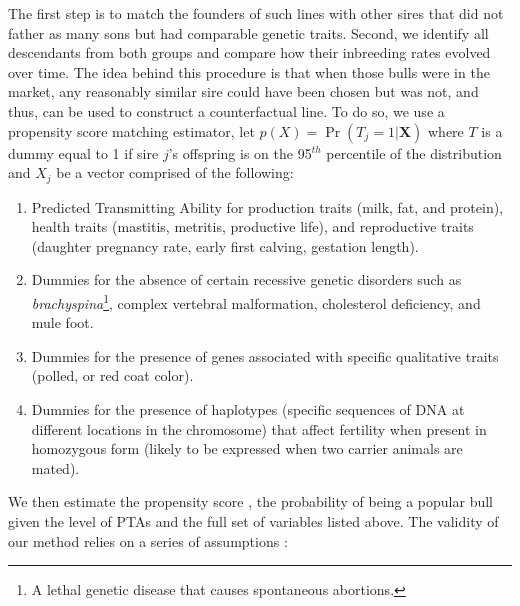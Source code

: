 \documentclass[12pt,letterpaper]{article}
\begin{document}

The first step is to match the founders of such lines with other sires that did not father as many sons but had comparable genetic traits. Second, we identify all descendants from both groups and compare how their inbreeding rates evolved over time. The idea behind this procedure is that when those bulls were in the market, any reasonably similar sire could have been chosen but was not, and thus, can be used to construct a counterfactual line. To do so, we use a propensity score matching estimator, let $p(X)=\Pr(T_{j} = 1 | \mathbf{X})$ where $T$ is a dummy equal to 1 if sire $j$'s offspring is on the 95$^{th}$ percentile of the distribution and $X_{j}$ be a vector comprised of the following:

\begin{enumerate}
    \item Predicted Transmitting Ability for production traits (milk, fat, and protein), health traits (mastitis, metritis, productive life), and reproductive traits (daughter pregnancy rate, early first calving, gestation length).
    \item Dummies for the absence of certain recessive genetic disorders \citep{sire_workbbok2021} such as \textit{brachyspina}\footnote{A lethal genetic disease that causes spontaneous abortions.}, complex vertebral malformation, cholesterol deficiency, and mule foot.
    \item Dummies for the presence of genes associated with specific qualitative traits (polled, or red coat color).
    \item Dummies for the presence of haplotypes (specific sequences of DNA at different locations in the chromosome) that affect fertility \citep{haplotypes2018} when present in homozygous form (likely to be expressed when two carrier animals are mated).
\end{enumerate}

We then estimate the propensity score \citep[p.~873]{Cameron_Trivedi2005}, the probability of being a popular bull given the level of PTAs and the full set of variables listed above. The validity of our method relies on a series of assumptions \citep{Heckman1997}:
\end{document}
